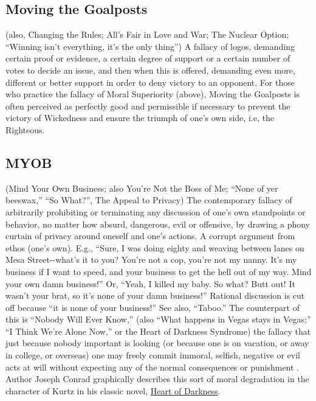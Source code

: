\documentclass[10pt,a4paper,british]{article}
\begin{document}
\begin{multicols}{2}
	\subsection{Moving the Goalposts} (also, Changing the Rules; All's Fair in
	Love and War; The Nuclear Option; ``Winning isn't everything, it's the only
	thing'') A fallacy of logos, demanding certain proof or evidence, a certain
	degree of support or a certain number of votes to decide an issue, and then
	when this is offered, demanding even more, different or better support in
	order to deny victory to an opponent. For those who practice the fallacy of
	Moral Superiority (above), Moving the Goalposts is often perceived as
	perfectly good and permissible if necessary to prevent the victory of
	Wickedness and ensure the triumph of one's own side, i.e, the Righteous.

	\subsection{MYOB} (Mind Your Own Business;  also You're Not the Boss of Me;
	``None of yer beeswax,'' ``So What?'', The Appeal to Privacy) The
	contemporary fallacy of arbitrarily prohibiting or terminating any
	discussion of one's own standpoints or behavior, no matter how absurd,
	dangerous, evil or offensive, by drawing a phony curtain of privacy around
	oneself and one's actions. A corrupt argument from ethos (one's own). E.g.,
	``Sure, I was doing eighty and weaving between lanes on Mesa
	Street{-}{-}what's it to you? You're not a cop, you're not my nanny. It's
	my business if I want to speed, and your business to get the hell out of my
	way. Mind your own damn business!'' Or, ``Yeah, I killed my baby. So what?
	Butt out! It wasn't your brat, so it's none of your damn business!''
	Rational discussion is cut off because ``it is none of your business!'' See
	also, ``Taboo.'' The counterpart of this is ``Nobody Will Ever Know,''
	(also ``What happens in Vegas stays in Vegas;'' ``I Think We're Alone
	Now,'' or the Heart of Darkness Syndrome) the fallacy that just because
	nobody important is looking (or because one is on vacation, or away in
	college, or overseas) one may freely commit immoral, selfish, negative or
	evil acts at will without expecting any of the normal consequences or
	punishment . Author Joseph Conrad graphically describes this sort of moral
	degradation in the character of Kurtz in his classic novel,
	\href{https://www.amazon.com/Heart-Darkness-Joseph-Conrad/dp/1503275922}{Heart
	of Darkness}.


\end{multicols}
\end{document}
